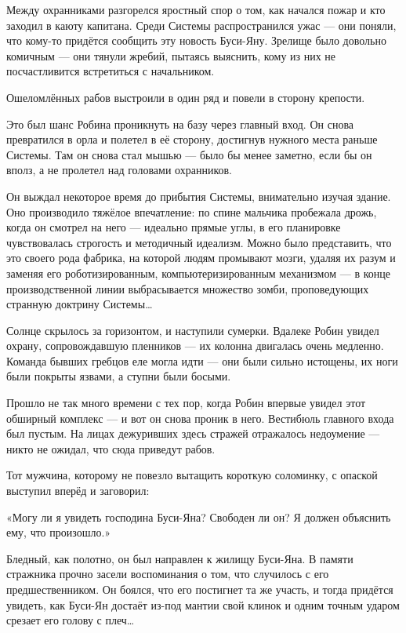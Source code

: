 \documentclass[a4paper,12pt]{book}
\begin{document}
Между охранниками разгорелся яростный спор о том, как начался пожар и кто заходил в каюту капитана. Среди Системы распространился ужас — они поняли, что кому-то придётся сообщить эту новость Буси-Яну. Зрелище было довольно комичным — они тянули жребий, пытаясь выяснить, кому из них не посчастливится встретиться с начальником.
\par
Ошеломлённых рабов выстроили в один ряд и повели в сторону крепости.
\par
Это был шанс Робина проникнуть на базу через главный вход. Он снова превратился в орла и полетел в её сторону, достигнув нужного места раньше Системы. Там он снова стал мышью — было бы менее заметно, если бы он вполз, а не пролетел над головами охранников.
\par
Он выждал некоторое время до прибытия Системы, внимательно изучая здание. Оно производило тяжёлое впечатление: по спине мальчика пробежала дрожь, когда он смотрел на него — идеально прямые углы, в его планировке чувствовалась строгость и методичный идеализм. Можно было представить, что это своего рода фабрика, на которой людям промывают мозги, удаляя их разум и заменяя его роботизированным, компьютеризированным механизмом — в конце производственной линии выбрасывается множество зомби, проповедующих странную доктрину Системы…\\
\par
Солнце скрылось за горизонтом, и наступили сумерки. Вдалеке Робин увидел охрану, сопровождавшую пленников — их колонна двигалась очень медленно. Команда бывших гребцов еле могла идти — они были сильно истощены, их ноги были покрыты язвами, а ступни были босыми.\\
\par
Прошло не так много времени с тех пор, когда Робин впервые увидел этот обширный комплекс — и вот он снова проник в него. Вестибюль главного входа был пустым. На лицах дежуривших здесь стражей отражалось недоумение — никто не ожидал, что сюда приведут рабов.
\par
Тот мужчина, которому не повезло вытащить короткую соломинку, с опаской выступил вперёд и заговорил:
\par
«Могу ли я увидеть господина Буси-Яна? Свободен ли он? Я должен объяснить ему, что произошло.»
\par
Бледный, как полотно, он был направлен к жилищу Буси-Яна. В памяти стражника прочно засели воспоминания о том, что случилось с его предшественником. Он боялся, что его постигнет та же участь, и тогда придётся увидеть, как Буси-Ян достаёт из-под мантии свой клинок и одним точным ударом срезает его голову с плеч…\\
\end{document}
